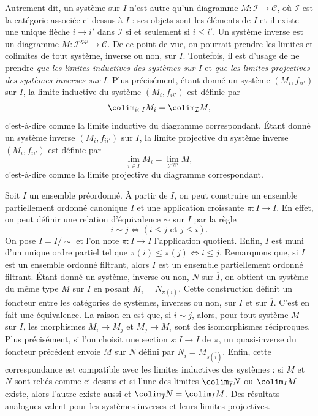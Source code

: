 \noindent
Autrement dit, un système sur $I$ n'est autre qu'un diagramme
$M : \mathcal{I} \to \mathcal{C}$, où $\mathcal{I}$ est la catégorie
associée ci-dessus à $I$ : ses objets sont les éléments de $I$ et il existe
une unique flèche $i \to i'$ dans $\mathcal{I}$ si et seulement si
$i \leq i'$. Un système inverse est un diagramme
$M : \mathcal{I}^{opp} \to \mathcal{C}$. De ce point de vue, on pourrait
prendre les limites et colimites de tout système, inverse ou non, sur $I$. Toutefois, il est
d'usage de ne prendre {\it que les limites inductives des systèmes sur $I$}
et {\it que les limites projectives des systèmes inverses sur $I$}.
Plus précisément, étant donné un système $(M_i, f_{ii'})$ sur $I$, la limite
inductive du système $(M_i, f_{ii'})$ est définie par
$$
\colim_{i \in I} M_i = \colim_\mathcal{I} M,
$$
c'est-à-dire comme la limite inductive du diagramme correspondant.
Étant donné un système inverse $(M_i, f_{ii'})$ sur $I$, la limite projective
du système inverse $(M_i, f_{ii'})$ est définie par
$$
\lim_{i \in I} M_i = \lim_{\mathcal{I}^{opp}} M,
$$
c'est-à-dire comme la limite projective du diagramme correspondant.

\begin{remark}
\label{remark-preorder-versus-partial-order}
Soit $I$ un ensemble préordonné. À partir de $I$, on peut construire un
ensemble partiellement ordonné canonique $\overline{I}$ et une application
croissante $\pi : I \to \overline{I}$. En effet, on peut définir une relation
d'équivalence $\sim$ sur $I$ par la règle
$$
i \sim j \Leftrightarrow (i \leq j\text{ et }j \leq i).
$$
On pose $\overline{I} = I/\sim$ et l'on note
$\pi : I \to \overline{I}$ l'application quotient. Enfin, $\overline{I}$
est muni d'un unique ordre partiel tel que
$\pi(i) \leq \pi(j) \Leftrightarrow i \leq j$.
Remarquons que, si $I$ est un ensemble ordonné filtrant, alors
$\overline{I}$ est un ensemble partiellement ordonné filtrant.
Étant donné un système, inverse ou non, $N$ sur $\overline{I}$, on obtient
un système du même type $M$ sur $I$ en posant $M_i = N_{\pi(i)}$.
Cette construction définit un foncteur entre les catégories de systèmes,
inverses ou non, sur $I$ et sur $\overline{I}$. C'est en fait une équivalence.
La raison en est que, si $i \sim j$, alors, pour tout système $M$ sur $I$,
les morphismes $M_i \to M_j$ et $M_j \to M_i$ sont des isomorphismes
réciproques. Plus précisément, si l'on choisit une section
$s : \overline{I} \to I$ de $\pi$, un quasi-inverse du foncteur précédent
envoie $M$ sur $N$ défini par
$N_{\overline{i}} = M_{s(\overline{i})}$.
Enfin, cette correspondance est compatible avec les limites inductives des
systèmes : si $M$ et $N$ sont reliés comme ci-dessus et si l'une des limites
$\colim_{\overline{I}} N$ ou $\colim_I M$ existe, alors l'autre existe aussi et
$\colim_{\overline{I}} N = \colim_I M$.
Des résultats analogues valent pour les systèmes inverses et leurs limites
projectives.
\end{remark}


